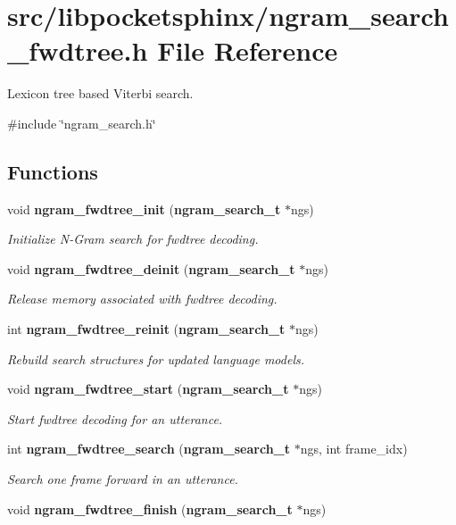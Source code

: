 \section{src/libpocketsphinx/ngram\-\_\-search\-\_\-fwdtree.h \-File \-Reference}
\label{ngram__search__fwdtree_8h}


\-Lexicon tree based \-Viterbi search.  


{\ttfamily \#include \char`\"{}ngram\-\_\-search.\-h\char`\"{}}\*
\subsection*{\-Functions}
\begin{DoxyCompactItemize}
\item 
void {\bf ngram\-\_\-fwdtree\-\_\-init} ({\bf ngram\-\_\-search\-\_\-t} $\ast$ngs)\label{ngram__search__fwdtree_8h_a72c89a2a1f189495abee00e1853cddcc}

\begin{DoxyCompactList}\small\item\em \-Initialize \-N-\/\-Gram search for fwdtree decoding. \end{DoxyCompactList}\item 
void {\bf ngram\-\_\-fwdtree\-\_\-deinit} ({\bf ngram\-\_\-search\-\_\-t} $\ast$ngs)\label{ngram__search__fwdtree_8h_a0e0e0436b30e1074114e1d37991c5d6b}

\begin{DoxyCompactList}\small\item\em \-Release memory associated with fwdtree decoding. \end{DoxyCompactList}\item 
int {\bf ngram\-\_\-fwdtree\-\_\-reinit} ({\bf ngram\-\_\-search\-\_\-t} $\ast$ngs)\label{ngram__search__fwdtree_8h_aa53827b47025d4e7a63f3ddce763d84e}

\begin{DoxyCompactList}\small\item\em \-Rebuild search structures for updated language models. \end{DoxyCompactList}\item 
void {\bf ngram\-\_\-fwdtree\-\_\-start} ({\bf ngram\-\_\-search\-\_\-t} $\ast$ngs)\label{ngram__search__fwdtree_8h_af736200cd01a5d743dbab447ecc85d08}

\begin{DoxyCompactList}\small\item\em \-Start fwdtree decoding for an utterance. \end{DoxyCompactList}\item 
int {\bf ngram\-\_\-fwdtree\-\_\-search} ({\bf ngram\-\_\-search\-\_\-t} $\ast$ngs, int frame\-\_\-idx)
\begin{DoxyCompactList}\small\item\em \-Search one frame forward in an utterance. \end{DoxyCompactList}\item 
void {\bf ngram\-\_\-fwdtree\-\_\-finish} ({\bf ngram\-\_\-search\-\_\-t} $\ast$ngs)\label{ngram__search__fwdtree_8h_af32a83dbb9187542577a0c500b000840}


\end{DoxyCompactItemize}
